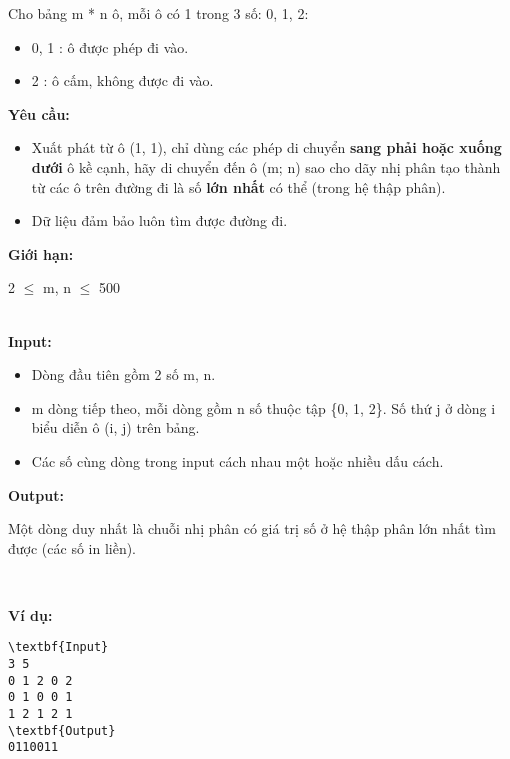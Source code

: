 

Cho bảng m * n ô, mỗi ô có 1 trong 3 số: 0, 1, 2:
\begin{itemize}
	\item 0, 1 : ô được phép đi vào.
	\item 2 : ô cấm, không được đi vào.
\end{itemize}

\textbf{Yêu cầu: }\textbf{}
\begin{itemize}
	\item Xuất phát từ ô (1, 1), chỉ dùng các phép di chuyển \textbf{ sang phải hoặc xuống dưới } ô kề cạnh, hãy di chuyển đến ô (m; n) sao cho dãy nhị phân tạo thành từ các ô trên đường đi là số \textbf{ lớn nhất } có thể (trong hệ thập phân).
	\item Dữ liệu đảm bảo luôn tìm được đường đi.
\end{itemize}

\textbf{Giới hạn: }

2  $\le$  m, n  $\le$  500


\\\textbf{Input: }\textbf{}
\begin{itemize}
	\item Dòng đầu tiên gồm 2 số m, n.
	\item m dòng tiếp theo, mỗi dòng gồm n số thuộc tập \{0, 1, 2\}. Số thứ j ở dòng i biểu diễn ô (i, j) trên bảng.
	\item Các số cùng dòng trong input cách nhau một hoặc nhiều dấu cách.
\end{itemize}

\textbf{Output: }

Một dòng duy nhất là chuỗi nhị phân có giá trị số ở hệ thập phân lớn nhất tìm được (các số in liền).

 

\textbf{Ví dụ: }\textbf{}
\begin{verbatim}
\textbf{Input}
3 5
0 1 2 0 2
0 1 0 0 1
1 2 1 2 1
\textbf{Output}
0110011\end{verbatim}
